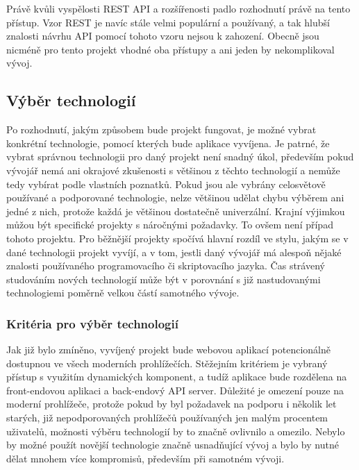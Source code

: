	Právě kvůli vyspělosti \ac{REST} \ac{API} a rozšířenosti padlo rozhodnutí právě na tento přístup.
	Vzor \ac{REST} je navíc stále velmi populární a používaný, a tak hlubší znalosti návrhu \ac{API} pomocí tohoto vzoru
	nejsou k zahození.
	Obecně jsou nicméně pro tento projekt vhodné oba přístupy a ani jeden by nekomplikoval vývoj.

	\subsection{Výběr technologií}

	Po rozhodnutí, jakým způsobem bude projekt fungovat, je možné vybrat konkrétní technologie,
	pomocí kterých bude aplikace vyvíjena.
	Je patrné, že vybrat správnou technologii pro daný projekt není snadný úkol, především pokud vývojář
	nemá ani okrajové zkušenosti s většinou z těchto technologií a nemůže tedy vybírat podle vlastních poznatků.
	Pokud jsou ale vybrány celosvětově používané a podporované technologie, nelze většinou udělat chybu výběrem ani
	jedné z nich, protože každá je většinou dostatečně univerzální.
	Krajní výjimkou můžou být specifické projekty s náročnými požadavky.
	To ovšem není případ tohoto projektu.
	Pro běžnější projekty spočívá hlavní rozdíl ve stylu, jakým se v dané technologii
	projekt vyvíjí, a v tom, jestli daný vývojář má alespoň nějaké znalosti používaného programovacího či skriptovacího jazyka.
	Čas strávený studováním nových technologií může být v porovnání s již nastudovanými technologiemi
	poměrně velkou částí samotného vývoje.

		\subsubsection{Kritéria pro výběr technologií}

		Jak již bylo zmíněno, vyvíjený projekt bude webovou aplikací potencionálně dostupnou ve všech moderních prohlížečích.
		Stěžejním kritériem je vybraný přístup s využitím dynamických komponent, a tudíž aplikace bude rozdělena
		na front-endovou aplikaci a back-endový \ac{API} server.
		Důležité je omezení pouze na moderní prohlížeče, protože pokud by byl požadavek na podporu i několik let starých,
		již nepodporovaných prohlížečů používaných jen malým procentem uživatelů, možnosti výběru technologií by to značně
		ovlivnilo a omezilo.
		Nebylo by možné použít novější technologie značně usnadňující vývoj a bylo by nutné dělat mnohem více kompromisů,
		především při samotném vývoji.


